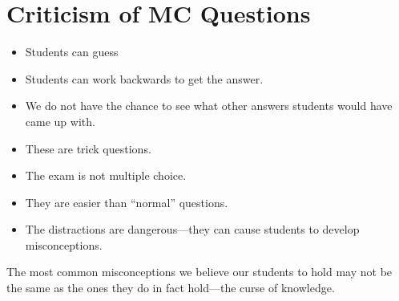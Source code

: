\documentclass{amsart}
\theoremstyle{theorem}\newtheorem{prompt}{Prompt}
\begin{document}
\section{Criticism of MC Questions}
\begin{itemize}
    \item Students can guess
    \item Students can work backwards to get the answer.
    \item We do not have the chance to see what other answers students would have came up with.
    \item These are trick questions.
    \item The exam is not multiple choice.
    \item They are easier than ``normal'' questions.
    \item The distractions are dangerous---they can cause students to develop misconceptions.
\end{itemize}

The most common misconceptions we believe our students to hold may not be the same as the ones they do in fact hold---the curse of knowledge.
        
\end{document}
